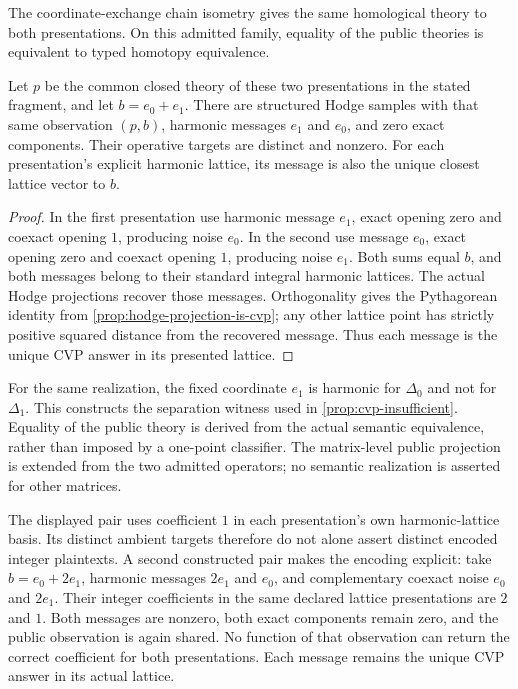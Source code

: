 The coordinate-exchange chain isometry gives the same homological theory
to both presentations. On this admitted family, equality of the public
theories is equivalent to typed homotopy equivalence.

\begin{proposition}
  \label{prop:cellular-axis-ambiguity}
  Let \(p\) be the common closed theory of these two presentations in the
  stated fragment, and let \(b=e_0+e_1\). There are structured Hodge samples
  with that same observation \((p,b)\), harmonic messages \(e_1\) and \(e_0\),
  and zero exact components. Their operative targets are distinct and nonzero.
  For each presentation's explicit harmonic lattice, its message is also the
  unique closest lattice vector to \(b\).
\end{proposition}

\begin{proof}
  In the first presentation use harmonic message \(e_1\), exact opening zero
  and coexact opening \(1\), producing noise \(e_0\). In the second use
  message \(e_0\), exact opening zero and coexact opening \(1\), producing
  noise \(e_1\). Both sums equal \(b\), and both messages belong to their
  standard integral harmonic lattices. The actual Hodge projections recover
  those messages. Orthogonality gives the Pythagorean identity from
  \cref{prop:hodge-projection-is-cvp}; any other lattice point has strictly
  positive squared distance from the recovered message. Thus each message
  is the unique CVP answer in its presented lattice.
\end{proof}

For the same realization, the fixed coordinate \(e_1\) is harmonic for
\(\Delta_0\) and not for \(\Delta_1\). This constructs the separation witness
used in \cref{prop:cvp-insufficient}. Equality of the public theory is
derived from the
actual semantic equivalence, rather than imposed by a one-point classifier.
The matrix-level public projection is extended from the two admitted
operators; no semantic realization is asserted for other matrices.

The displayed pair uses coefficient \(1\) in each presentation's own
harmonic-lattice basis. Its distinct ambient targets therefore do not alone
assert distinct encoded integer plaintexts. A second constructed pair makes
the encoding explicit: take \(b=e_0+2e_1\), harmonic messages \(2e_1\) and
\(e_0\), and complementary coexact noise \(e_0\) and \(2e_1\). Their integer
coefficients in the same declared lattice presentations are \(2\) and \(1\).
Both messages are nonzero, both exact components remain zero, and the public
observation is again shared. No function of that observation can return the
correct coefficient for both presentations. Each message remains the unique
CVP answer in its actual lattice.

